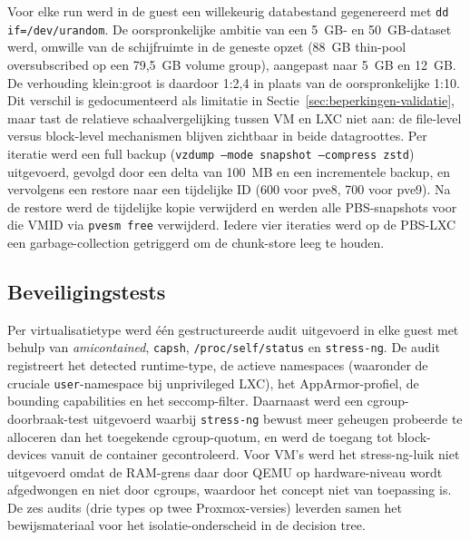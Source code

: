 Voor elke run werd in de guest een willekeurig databestand gegenereerd met \texttt{dd if=/dev/urandom}. De oorspronkelijke ambitie van een 5~GB- en 50~GB-dataset werd, omwille van de schijfruimte in de geneste opzet (88~GB thin-pool oversubscribed op een 79,5~GB volume group), aangepast naar 5~GB en 12~GB. De verhouding klein:groot is daardoor 1:2,4 in plaats van de oorspronkelijke 1:10. Dit verschil is gedocumenteerd als limitatie in Sectie~\ref{sec:beperkingen-validatie}, maar tast de relatieve schaalvergelijking tussen VM en LXC niet aan: de file-level versus block-level mechanismen blijven zichtbaar in beide datagroottes. Per iteratie werd een full backup (\texttt{vzdump --mode snapshot --compress zstd}) uitgevoerd, gevolgd door een delta van 100~MB en een incrementele backup, en vervolgens een restore naar een tijdelijke ID (600 voor pve8, 700 voor pve9). Na de restore werd de tijdelijke kopie verwijderd en werden alle PBS-snapshots voor die VMID via \texttt{pvesm free} verwijderd. Iedere vier iteraties werd op de PBS-LXC een garbage-collection getriggerd om de chunk-store leeg te houden.

\subsection{Beveiligingstests}
Per virtualisatietype werd één gestructureerde audit uitgevoerd in elke guest met behulp van \textit{amicontained}, \texttt{capsh}, \texttt{/proc/self/status} en \texttt{stress-ng}. De audit registreert het detected runtime-type, de actieve namespaces (waaronder de cruciale \texttt{user}-namespace bij unprivileged LXC), het AppArmor-profiel, de bounding capabilities en het seccomp-filter. Daarnaast werd een cgroup-doorbraak-test uitgevoerd waarbij \texttt{stress-ng} bewust meer geheugen probeerde te alloceren dan het toegekende cgroup-quotum, en werd de toegang tot block-devices vanuit de container gecontroleerd. Voor VM's werd het stress-ng-luik niet uitgevoerd omdat de RAM-grens daar door QEMU op hardware-niveau wordt afgedwongen en niet door cgroups, waardoor het concept niet van toepassing is. De zes audits (drie types op twee Proxmox-versies) leverden samen het bewijsmateriaal voor het isolatie-onderscheid in de decision tree.

